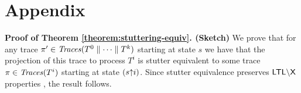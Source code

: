 \section*{Appendix}
%
\noindent \textbf{Proof of Theorem  \ref{theorem:stuttering-equiv}. (Sketch)} We prove that for any trace $\pi' \in \mathit{Traces}(T^0 \parallel \dots \parallel T^k)$ starting at state $s$
we have that the projection of this trace to process $T^i$ is stutter equivalent to some trace $\pi \in \mathit{Traces}(T^i)$ starting at state $(s \mathord{\uparrow} i)$. 
Since stutter equivalence preserves $\textsf{LTL$\setminus$X}$ properties \cite{PeledWilke1997},  the result follows. 

